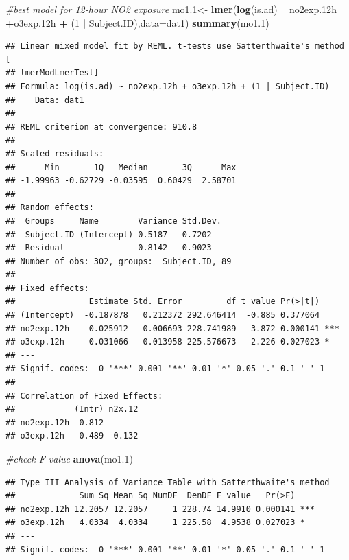 \documentclass[12pt,]{article}
\newenvironment{Shaded}{\begin{snugshade}}{\end{snugshade}}
\newcommand{\CommentTok}[1]{\textcolor[rgb]{0.56,0.35,0.01}{\textit{#1}}}
\newcommand{\DataTypeTok}[1]{\textcolor[rgb]{0.13,0.29,0.53}{#1}}
\newcommand{\DecValTok}[1]{\textcolor[rgb]{0.00,0.00,0.81}{#1}}
\newcommand{\FloatTok}[1]{\textcolor[rgb]{0.00,0.00,0.81}{#1}}
\newcommand{\KeywordTok}[1]{\textcolor[rgb]{0.13,0.29,0.53}{\textbf{#1}}}
\newcommand{\NormalTok}[1]{#1}
\newcommand{\OperatorTok}[1]{\textcolor[rgb]{0.81,0.36,0.00}{\textbf{#1}}}
\newcommand{\StringTok}[1]{\textcolor[rgb]{0.31,0.60,0.02}{#1}}
\begin{document}
\begin{Shaded}
\begin{Highlighting}[]
\CommentTok{#best model for 12-hour NO2 exposure}
\NormalTok{mo1}\FloatTok{.1}\NormalTok{<-}\StringTok{ }\KeywordTok{lmer}\NormalTok{(}\KeywordTok{log}\NormalTok{(is.ad) }\OperatorTok{~}\StringTok{ }\NormalTok{no2exp}\FloatTok{.12}\NormalTok{h }\OperatorTok{+}\NormalTok{o3exp}\FloatTok{.12}\NormalTok{h }\OperatorTok{+}\StringTok{ }\NormalTok{(}\DecValTok{1} \OperatorTok{|}\StringTok{ }\NormalTok{Subject.ID),}\DataTypeTok{data=}\NormalTok{dat1)}
\KeywordTok{summary}\NormalTok{(mo1}\FloatTok{.1}\NormalTok{)}
\end{Highlighting}
\end{Shaded}

\begin{verbatim}
## Linear mixed model fit by REML. t-tests use Satterthwaite's method [
## lmerModLmerTest]
## Formula: log(is.ad) ~ no2exp.12h + o3exp.12h + (1 | Subject.ID)
##    Data: dat1
## 
## REML criterion at convergence: 910.8
## 
## Scaled residuals: 
##      Min       1Q   Median       3Q      Max 
## -1.99963 -0.62729 -0.03595  0.60429  2.58701 
## 
## Random effects:
##  Groups     Name        Variance Std.Dev.
##  Subject.ID (Intercept) 0.5187   0.7202  
##  Residual               0.8142   0.9023  
## Number of obs: 302, groups:  Subject.ID, 89
## 
## Fixed effects:
##               Estimate Std. Error         df t value Pr(>|t|)    
## (Intercept)  -0.187878   0.212372 292.646414  -0.885 0.377064    
## no2exp.12h    0.025912   0.006693 228.741989   3.872 0.000141 ***
## o3exp.12h     0.031066   0.013958 225.576673   2.226 0.027023 *  
## ---
## Signif. codes:  0 '***' 0.001 '**' 0.01 '*' 0.05 '.' 0.1 ' ' 1
## 
## Correlation of Fixed Effects:
##            (Intr) n2x.12
## no2exp.12h -0.812       
## o3exp.12h  -0.489  0.132
\end{verbatim}

\begin{Shaded}
\begin{Highlighting}[]
\CommentTok{#check F value}
\KeywordTok{anova}\NormalTok{(mo1}\FloatTok{.1}\NormalTok{)}
\end{Highlighting}
\end{Shaded}

\begin{verbatim}
## Type III Analysis of Variance Table with Satterthwaite's method
##             Sum Sq Mean Sq NumDF  DenDF F value   Pr(>F)    
## no2exp.12h 12.2057 12.2057     1 228.74 14.9910 0.000141 ***
## o3exp.12h   4.0334  4.0334     1 225.58  4.9538 0.027023 *  
## ---
## Signif. codes:  0 '***' 0.001 '**' 0.01 '*' 0.05 '.' 0.1 ' ' 1
\end{verbatim}
\end{document}
